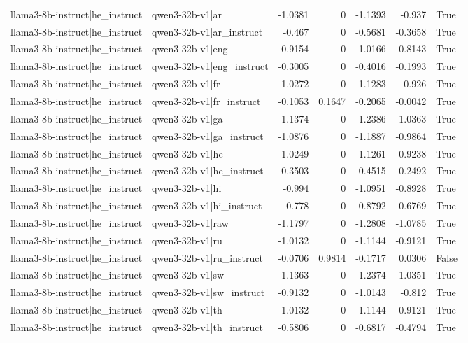 \begin{table}
\begin{tabular}{l l r r r r l}
llama3-8b-instruct|he_instruct & qwen3-32b-v1|ar & -1.0381 & 0 & -1.1393 & -0.937 & True \\
llama3-8b-instruct|he_instruct & qwen3-32b-v1|ar_instruct & -0.467 & 0 & -0.5681 & -0.3658 & True \\
llama3-8b-instruct|he_instruct & qwen3-32b-v1|eng & -0.9154 & 0 & -1.0166 & -0.8143 & True \\
llama3-8b-instruct|he_instruct & qwen3-32b-v1|eng_instruct & -0.3005 & 0 & -0.4016 & -0.1993 & True \\
llama3-8b-instruct|he_instruct & qwen3-32b-v1|fr & -1.0272 & 0 & -1.1283 & -0.926 & True \\
llama3-8b-instruct|he_instruct & qwen3-32b-v1|fr_instruct & -0.1053 & 0.1647 & -0.2065 & -0.0042 & True \\
llama3-8b-instruct|he_instruct & qwen3-32b-v1|ga & -1.1374 & 0 & -1.2386 & -1.0363 & True \\
llama3-8b-instruct|he_instruct & qwen3-32b-v1|ga_instruct & -1.0876 & 0 & -1.1887 & -0.9864 & True \\
llama3-8b-instruct|he_instruct & qwen3-32b-v1|he & -1.0249 & 0 & -1.1261 & -0.9238 & True \\
llama3-8b-instruct|he_instruct & qwen3-32b-v1|he_instruct & -0.3503 & 0 & -0.4515 & -0.2492 & True \\
llama3-8b-instruct|he_instruct & qwen3-32b-v1|hi & -0.994 & 0 & -1.0951 & -0.8928 & True \\
llama3-8b-instruct|he_instruct & qwen3-32b-v1|hi_instruct & -0.778 & 0 & -0.8792 & -0.6769 & True \\
llama3-8b-instruct|he_instruct & qwen3-32b-v1|raw & -1.1797 & 0 & -1.2808 & -1.0785 & True \\
llama3-8b-instruct|he_instruct & qwen3-32b-v1|ru & -1.0132 & 0 & -1.1144 & -0.9121 & True \\
llama3-8b-instruct|he_instruct & qwen3-32b-v1|ru_instruct & -0.0706 & 0.9814 & -0.1717 & 0.0306 & False \\
llama3-8b-instruct|he_instruct & qwen3-32b-v1|sw & -1.1363 & 0 & -1.2374 & -1.0351 & True \\
llama3-8b-instruct|he_instruct & qwen3-32b-v1|sw_instruct & -0.9132 & 0 & -1.0143 & -0.812 & True \\
llama3-8b-instruct|he_instruct & qwen3-32b-v1|th & -1.0132 & 0 & -1.1144 & -0.9121 & True \\
llama3-8b-instruct|he_instruct & qwen3-32b-v1|th_instruct & -0.5806 & 0 & -0.6817 & -0.4794 & True \\

\end{tabular}
\end{table}
